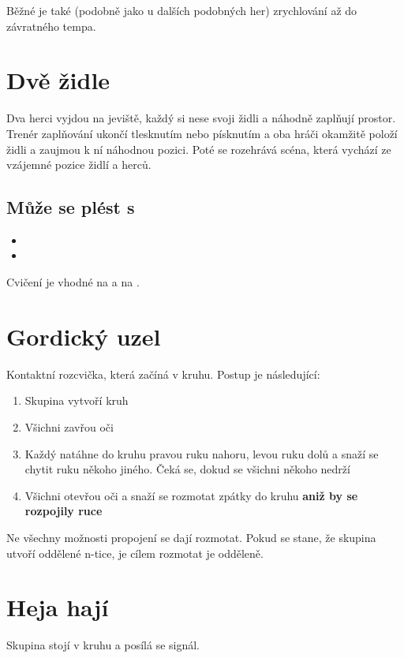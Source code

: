Běžné je také (podobně jako u dalších podobných her) zrychlování až do závratného tempa. 
 
 
 
 
\needspace{5cm} \section{Dvě židle} \label{dvě židle} Dva herci vyjdou na jeviště, každý si nese svoji židli a náhodně zaplňují prostor. Trenér zaplňování ukončí tlesknutím nebo písknutím a oba hráči okamžitě položí židli a zaujmou k ní náhodnou pozici. Poté se rozehrává scéna, která vychází ze vzájemné pozice židlí a herců. 
 
\subsection{Může se plést s} \begin{itemize}
\item  {}
\item  {}
\end{itemize}
 
Cvičení je vhodné na  a na . 
 
 
 
\needspace{5cm} \section{Gordický uzel} \label{gordický uzel} Kontaktní rozcvička, která začíná v kruhu. Postup je následující: 
 
\begin{enumerate}
\item  Skupina vytvoří kruh
\item  Všichni zavřou oči
\item  Každý natáhne do kruhu pravou ruku nahoru, levou ruku dolů a snaží se chytit ruku někoho jiného. Čeká se, dokud se všichni někoho nedrží
\item  Všichni otevřou oči a snaží se rozmotat zpátky do kruhu \textbf{aniž by se rozpojily ruce}{}
\end{enumerate}
 
Ne všechny možnosti propojení se dají rozmotat. Pokud se stane, že skupina utvoří oddělené n-tice, je cílem rozmotat je odděleně. 
 
 
 
 
 
\needspace{5cm} \section{Heja hají} \label{heja hají} Skupina stojí v kruhu a posílá se signál. 
 
